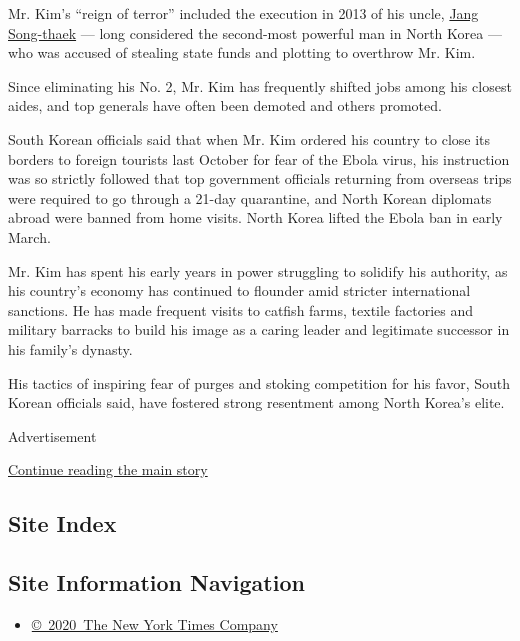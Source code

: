 Mr. Kim's ``reign of terror'' included the execution in 2013 of his
uncle,
\href{http://www.nytimes.com/2013/12/24/world/asia/north-korea-purge.html}{Jang
Song-thaek} --- long considered the second-most powerful man in North
Korea --- who was accused of stealing state funds and plotting to
overthrow Mr. Kim.

Since eliminating his No. 2, Mr. Kim has frequently shifted jobs among
his closest aides, and top generals have often been demoted and others
promoted.

South Korean officials said that when Mr. Kim ordered his country to
close its borders to foreign tourists last October for fear of the Ebola
virus, his instruction was so strictly followed that top government
officials returning from overseas trips were required to go through a
21-day quarantine, and North Korean diplomats abroad were banned from
home visits. North Korea lifted the Ebola ban in early March.

Mr. Kim has spent his early years in power struggling to solidify his
authority, as his country's economy has continued to flounder amid
stricter international sanctions. He has made frequent visits to catfish
farms, textile factories and military barracks to build his image as a
caring leader and legitimate successor in his family's dynasty.

His tactics of inspiring fear of purges and stoking competition for his
favor, South Korean officials said, have fostered strong resentment
among North Korea's elite.

Advertisement

\protect\hyperlink{after-bottom}{Continue reading the main story}

\hypertarget{site-index}{%
\subsection{Site Index}\label{site-index}}

\hypertarget{site-information-navigation}{%
\subsection{Site Information
Navigation}\label{site-information-navigation}}

\begin{itemize}
\tightlist
\item
  \href{https://help.nytimes.com/hc/en-us/articles/115014792127-Copyright-notice}{©~2020~The
  New York Times Company}
\end{itemize}

